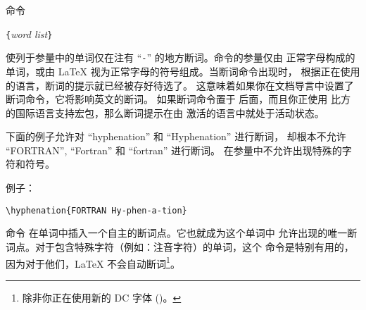命令
\begin{lscommand}
\verb|{|\emph{word list}\verb|}|
\end{lscommand}
使列于参量中的单词仅在注有 ``\verb|-|'' 的地方断词。命令的参量仅由
正常字母构成的单词，或由 \LaTeX{} 视为正常字母的符号组成。当断词命令出现时，
根据正在使用的语言，断词的提示就已经被存好待选了。
这意味着如果你在文档导言中设置了断词命令，它将影响英文的断词。
如果断词命令置于 \verb|| 后面，而且你正使用
比方  的国际语言支持宏包，那么断词提示在由  
激活的语言中就处于活动状态。

下面的例子允许对 ``hyphenation'' 和 ``Hyphenation'' 进行断词，
却根本不允许 ``FORTRAN'', ``Fortran'' 和 ``fortran'' 进行断词。
在参量中不允许出现特殊的字符和符号。

例子：
\begin{code}
\verb|\hyphenation{FORTRAN Hy-phen-a-tion}|
\end{code}

命令 \ci{-} 在单词中插入一个自主的断词点。它也就成为这个单词中
允许出现的唯一断词点。对于包含特殊字符（例如：注音字符）的单词，这个
命令是特别有用的，因为对于他们，\LaTeX{} 不会自动断词\footnote{除非你正在使用新的 DC 字体 ()。}。


